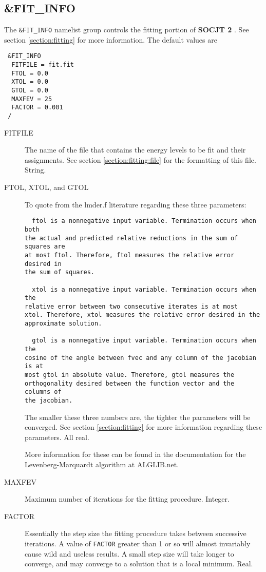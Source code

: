\documentclass{article}
\newcommand{\socjttwo}{{\bf SOCJT 2}}
\begin{document}
\subsection{\&FIT\_INFO} \label{fitinfo}

The {\tt \&FIT\_INFO} namelist group controls the fitting portion of \socjttwo
. See section \ref{section:fitting} for more information. The default values are

\begin{verbatim}
 &FIT_INFO
  FITFILE = fit.fit
  FTOL = 0.0
  XTOL = 0.0
  GTOL = 0.0
  MAXFEV = 25
  FACTOR = 0.001
 /
\end{verbatim}

\begin{description}

\item[FITFILE] The name of the file that contains the energy levels
  to be fit and their assignments.  See section \ref{section:fitting:file} for
  the formatting of this file. String.

\item[FTOL, XTOL, and GTOL] To quote from the lmder.f
  literature regarding these three parameters:
  \begin{verbatim}
  ftol is a nonnegative input variable. Termination occurs when both
the actual and predicted relative reductions in the sum of squares are
at most ftol. Therefore, ftol measures the relative error desired in
the sum of squares. 

  xtol is a nonnegative input variable. Termination occurs when the
relative error between two consecutive iterates is at most
xtol. Therefore, xtol measures the relative error desired in the
approximate solution. 

  gtol is a nonnegative input variable. Termination occurs when the
cosine of the angle between fvec and any column of the jacobian is at
most gtol in absolute value. Therefore, gtol measures the
orthogonality desired between the function vector and the columns of
the jacobian. 
 \end{verbatim}

 The smaller these three numbers are, the tighter the parameters will
 be converged. See section \ref{section:fitting} for more
 information regarding these parameters. All real.
 
 More information for these can be found in the documentation for the Levenberg-Marquardt algorithm at ALGLIB.net.

\item[MAXFEV] Maximum number of iterations for the fitting
  procedure. Integer.

\item[FACTOR] Essentially the step size the fitting procedure takes
  between successive iterations. A value of {\tt FACTOR} greater than 1 or
  so will almost invariably cause wild and useless results. A small
  step size will take longer to converge, and may converge to a
  solution that is a local minimum. Real.

\end{description}
\end{document}

